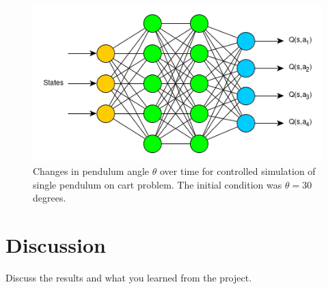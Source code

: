 \documentclass{LTHtwocol} %
\begin{document}
\begin{figure}[H]
	\centering
	\includegraphics[width=0.9\columnwidth]{figures/q_network.png}
	\caption{Changes in pendulum angle $\theta$ over time for controlled simulation of single pendulum on cart problem. The initial condition was $\theta = 30$ degrees.}
	\label{fig:single_pendulum_outside_training_domain}
\end{figure}









\section{Discussion}

Discuss the results and what you learned from the project.


\printbibliography
\end{document}
